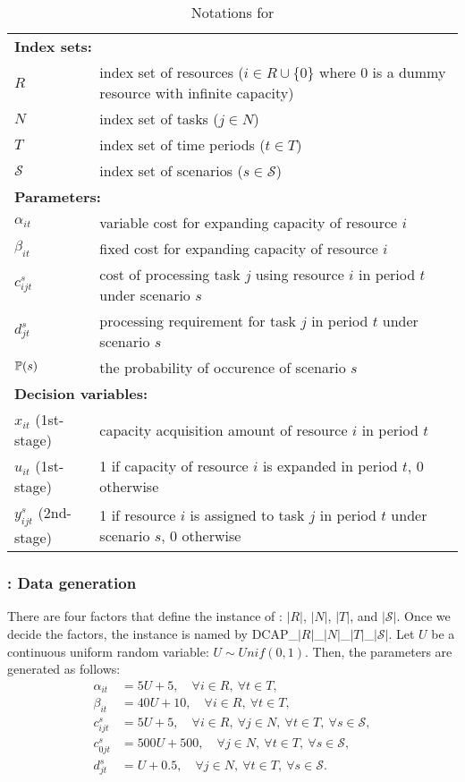 \begin{table}[H]
	\caption{Notations for \dcap}
	\label{dcap:notation}
	\resizebox{\textwidth}{!}
	{
		\begin{tabular}{ll}
			\toprule
			\multicolumn{2}{l}{\textbf{Index sets:}} \\
			$R$ & index set of resources ($i\in R\cup\{0\}$ where $0$ is a dummy resource with infinite capacity) \\ 
			$N$ & index set of tasks ($j\in N$)\\ 
			$T$ & index set of time periods ($t\in T$)\\
			$\mathcal{S}$ & index set of scenarios ($s\in \mathcal{S}$) \\ \midrule
			\multicolumn{2}{l}{\textbf{Parameters:}} \\
			$\alpha_{it}$ & variable cost for expanding capacity of resource $i$\\ 
			$\beta_{it}$ & fixed cost for expanding capacity of resource $i$ \\ 
			$c_{ijt}^{s}$ & cost of processing task $j$ using resource $i$ in period $t$ under scenario $s$ \\ 
			$d_{jt}^s$	& processing requirement for task $j$ in period $t$ under scenario $s$		\\
			$\operatorname*{\mathbb{P}}(s)$ & \textrm{the probability of occurence of scenario $s$} \\ \midrule
			\multicolumn{2}{l}{\textbf{Decision variables:}} \\
			$x_{it}$ (1st-stage) & capacity acquisition amount of resource $i$ in period $t$ \\ 
			$u_{it}$ (1st-stage)& 1 if capacity of resource $i$ is expanded in period $t$, 0 otherwise \\ 
			$y_{ijt}^s$ (2nd-stage)& 1 if resource $i$ is assigned to task $j$ in period $t$ under scenario $s$, 0 otherwise\\
			\bottomrule
		\end{tabular}
	}
\end{table} 

\subsubsection{\dcap: Data generation} \label{subsubsec:dcap_data_gen}
There are four factors that define the instance of \dcap: $|R|$, $|N|$, $|T|$, and $|\mathcal{S}|$. Once we decide the factors, the instance is named by DCAP\_$|R|$\_$|N|$\_$|T|$\_$|\mathcal{S}|$. Let $U$ be a continuous uniform random variable: $U\sim Unif(0,1)$. Then, the parameters are generated as follows:
\begin{align*}
	\alpha_{it}&=5U+5,\quad\forall i\in R,\ \forall t\in T, \\
	\beta_{it} &=40U+10,\quad\forall i\in R,\ \forall t\in T, \\
	c_{ijt}^s  &=5U+5,\quad\forall i\in R,\ \forall j\in N,\ \forall t\in T,\ \forall s\in\mathcal{S}, \\
	c_{0jt}^s  &=500U+500,\quad\forall j\in N,\ \forall t\in T,\ \forall s\in\mathcal{S}, \\
	d_{jt}^s   &=U+0.5,\quad\forall j\in N,\ \forall t\in T,\ \forall s\in\mathcal{S}.
\end{align*}

